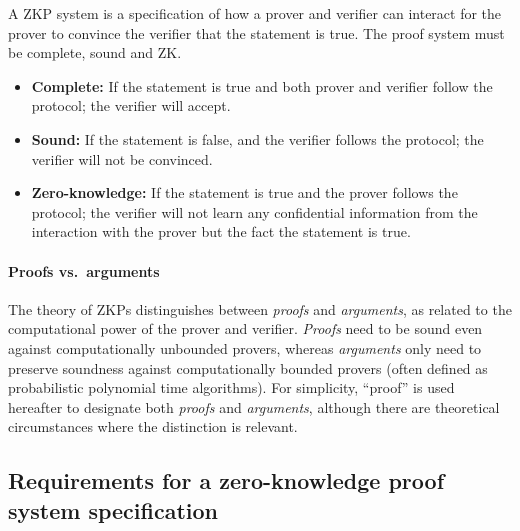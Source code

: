 
A ZKP system is a specification of how a prover and verifier can interact for the prover to convince the verifier that the statement is true.
The proof system must be complete, sound and ZK.


\begin{itemize}

\item \textbf{Complete:} If the statement is true and both prover and verifier follow the protocol; the verifier will accept.

\item \textbf{Sound:} If the statement is false, and the verifier follows the protocol; the verifier will not be convinced.

\item \textbf{Zero-knowledge:} If the statement is true and the prover follows the protocol; the verifier will not learn any confidential information from the interaction with the prover but the fact the statement is true.

\end{itemize}


\paragraph{Proofs vs.\ arguments}
The theory of ZKPs distinguishes between \emph{proofs} and \emph{arguments}, as related to the computational power of the prover and verifier.
\emph{Proofs} need to be sound even against computationally unbounded provers, whereas \emph{arguments} only need to preserve soundness against computationally bounded provers (often defined as probabilistic polynomial time algorithms).
For simplicity, ``proof'' is used hereafter to designate both \emph{proofs} and \emph{arguments}, although there are theoretical circumstances where the distinction is relevant.


\subsection[Requirements for a ZK proof system specification]{Requirements for a zero-knowledge proof system specification}
\label{security:intro:requirements-ZK}

